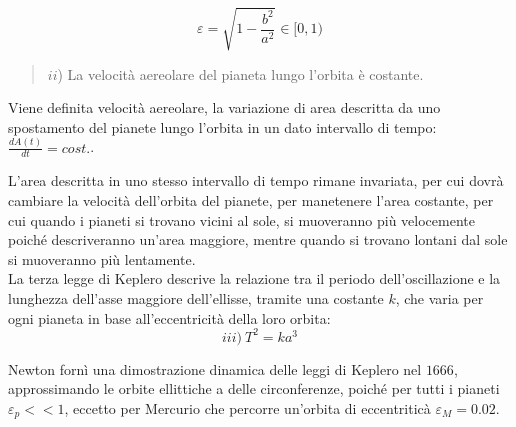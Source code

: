 \documentclass{article}
\numberwithin{equation}{subsection}
\begin{document}
\begin{equation}
    \varepsilon=\sqrt{1-\displaystyle\frac{b^2}{a^2}}\in[0,1)
\end{equation}

\begin{quotation}
    $ii$) La velocità aereolare del pianeta lungo l'orbita è costante. 
\end{quotation}

Viene definita velocità aereolare, la variazione di area descritta da uno spostamento del pianete lungo l'orbita in un dato intervallo di tempo: 
$\displaystyle\frac{dA(t)}{dt}=cost.$. 

\begin{center}
\end{center}

L'area descritta in uno stesso intervallo di tempo rimane invariata, per cui dovrà cambiare la velocità dell'orbita del pianete, per manetenere l'area 
costante, per cui quando i pianeti si trovano vicini al sole, si muoveranno più velocemente poiché descriveranno un'area maggiore, mentre quando si 
trovano lontani dal sole si muoveranno più lentamente. \\

La terza legge di Keplero descrive la relazione tra il periodo dell'oscillazione e la lunghezza dell'asse maggiore dell'ellisse, tramite una costante 
$k$, che varia per ogni pianeta in base all'eccentricità della loro orbita: 
\begin{equation}
    iii\mbox{)}\:T^2=ka^3
\end{equation}

Newton fornì una dimostrazione dinamica delle leggi di Keplero nel $1666$, approssimando le orbite ellittiche a delle circonferenze, poiché 
per tutti i pianeti $\varepsilon_p<<1$, eccetto per Mercurio che percorre un'orbita di eccentriticà $\varepsilon_M=0.02$. 

\begin{center}
\end{center}
\end{document}
